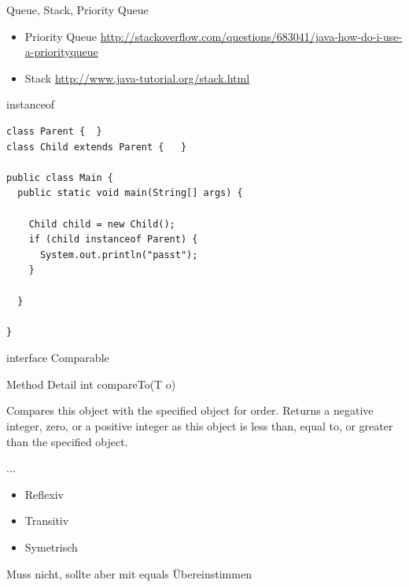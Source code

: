 \documentclass[18pt]{beamer}
\begin{document}
\begin{frame}{Queue, Stack, Priority Queue}
\begin{itemize}
 \item Priority Queue \url{http://stackoverflow.com/questions/683041/java-how-do-i-use-a-priorityqueue}
 \item Stack \url{http://www.java-tutorial.org/stack.html}
\end{itemize}

 
\end{frame}

\begin{frame}[fragile]{instanceof}
 \begin{lstlisting}
class Parent {  }
class Child extends Parent {   }

public class Main {
  public static void main(String[] args) {

    Child child = new Child();
    if (child instanceof Parent) {
      System.out.println("passt");
    }

  }

}
 \end{lstlisting}

\end{frame}

\begin{frame}{interface Comparable}
 \begin{exampleblock}{Method Detail}
int compareTo(T o)

Compares this object with the specified object for order. Returns a negative integer, zero, or a positive integer as this object is less than, equal to, or greater than the specified object. 

...
 \end{exampleblock}
 \begin{itemize}
  \item Reflexiv
  \item Transitiv
  \item Symetrisch
 \end{itemize}
Muss nicht, sollte aber mit equals Übereinstimmen
\end{frame}
\end{document}
